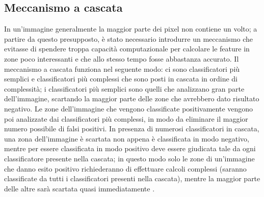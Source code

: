 \subsection{Meccanismo a cascata}
In un'immagine generalmente la maggior parte dei pixel non contiene un volto; a partire da questo presupposto, è stato necessario introdurre un meccanismo che evitasse di spendere troppa capacità computazionale per calcolare le feature in zone poco interessanti e che allo stesso tempo fosse abbastanza accurato. Il meccanismo a cascata funziona nel seguente modo: ci sono classificatori più semplici e classificatori più complessi che sono posti in cascata in ordine di complessità; i classificatori più semplici sono quelli che analizzano gran parte dell'immagine, scartando la maggior parte delle zone che avrebbero dato risultato negativo. Le zone dell'immagine che vengono classificate positivamente vengono poi analizzate dai classificatori più complessi, in modo da eliminare il maggior numero possibile di falsi positivi. In presenza di numerosi classificatori in cascata, una zona dell'immagine è scartata non appena è classificata in modo negativo, mentre per essere classificata in modo positivo deve essere giudicata tale da ogni classificatore presente nella cascata; in questo modo solo le zone di un'immagine che danno esito positivo richiederanno di effettuare calcoli complessi (saranno classificate da tutti i classificatori presenti nella cascata), mentre la maggior parte delle altre sarà scartata quasi immediatamente \cite{viola2001rapid}.

